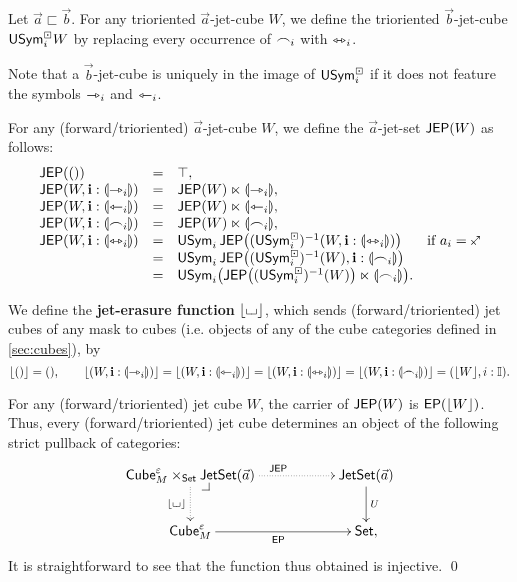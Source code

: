 \documentclass[a4paper]{article}
\begin{document}
\begin{definition} \label{def:sym-forget-cube}
	Let $\vec a \sqsubset \vec b$. For any trioriented $\vec a$-jet-cube $W$, we define the trioriented $\vec b$-jet-cube $\mathsf{USym}^\boxdot_i W$ by replacing every occurrence of $\frown_i$ with $\leftrightarrowtriangle_i$.
\end{definition}
Note that a $\vec b$-jet-cube is uniquely in the image of $\mathsf{USym}^\boxdot_i$ if it does not feature the symbols $\rightarrowtriangle_i$ and $\leftarrowtriangle_i$.
\begin{definition} \label{def:jep}
	For any (forward/trioriented) $\vec a$-jet-cube $W$, we define the $\vec a$-jet-set $\mathsf{JEP}(W)$ as follows:
	\[ \begin{array}{l c l l}
		\JEP(()) &=& \top, \\
		\JEP(W, \dm i : \rival{\jet_i}) &=& \JEP(W) \multip \rival{\jet_i}, \\
		\JEP(W, \dm i : \rival{\tej_i}) &=& \JEP(W) \multip \rival{\tej_i}, \\
		\JEP(W, \dm i : \rival{\edge_i}) &=& \JEP(W) \multip \rival{\edge_i}, \\
		\JEP(W, \dm i : \rival{\equijet_i}) &=& \Usym_i \, \JEP\paren{(\Usymcube_i)\inv(W, \dm i : \rival{\equijet_i})}
		& \text{if $a_i = \ypolar$} \\
		&=& \Usym_i \, \JEP\paren{(\Usymcube_i)\inv(W), \dm i : \rival{\edge_i}} \\
		&=& \Usym_i\paren{\JEP\paren{(\Usymcube_i)\inv(W)} \multip \rival{\edge_i}}.
	\end{array} \]
\end{definition}
\begin{definition} \label{def:jet-cube-erasure}
	We define the \textbf{jet-erasure function} $\mathopen{}\left\lfloor {\llcorner\hspace{-.4ex}\lrcorner} \right\rfloor\mathclose{}$, which sends (forward/trioriented) jet cubes of any mask to cubes (i.e. objects of any of the cube categories defined in \cref{sec:cubes}), by
	\[
		\mathopen{}\left\lfloor () \right\rfloor\mathclose{} = (),
		\qquad
		\mathopen{}\left\lfloor (W, \mathbf{i} : {\llparenthesis \rightarrowtriangle_i \rrparenthesis}) \right\rfloor\mathclose{} =
		\mathopen{}\left\lfloor (W, \mathbf{i} : {\llparenthesis \leftarrowtriangle_i \rrparenthesis}) \right\rfloor\mathclose{} =
		\mathopen{}\left\lfloor (W, \mathbf{i} : {\llparenthesis \leftrightarrowtriangle_i \rrparenthesis}) \right\rfloor\mathclose{} =
		\mathopen{}\left\lfloor (W, \mathbf{i} : {\llparenthesis \frown_i \rrparenthesis}) \right\rfloor\mathclose{} =
		(\mathopen{}\left\lfloor W \right\rfloor\mathclose{}, i : {\mathbb I}).
	\]
\end{definition}
\begin{corollary} \label{thm:jet-cube-pullback}
	For any (forward/trioriented) jet cube $W$, the carrier of $\mathsf{JEP}(W)$ is $\mathsf{EP}(\mathopen{}\left\lfloor W \right\rfloor\mathclose{})$.
	Thus, every (forward/trioriented) jet cube determines an object of the following strict pullback of categories:
	\[
			\xymatrix{
				\cubecat^\eps_M \times_\Set \jetset{\vec a}
					\ar@{.>}[rr]^{\JEP}
					\ar@{.>}[d]_{\erasejc{\loch}}
					\xydrcorner
				&&
				\jetset{\vec a}
					\ar[d]^U
				\\
				\cubecat^\eps_M
					\ar[rr]_{\EP}
				&&
				\Set,
			}
	\]
	It is straightforward to see that the function thus obtained is injective. \qed
\end{corollary}
\end{document}
